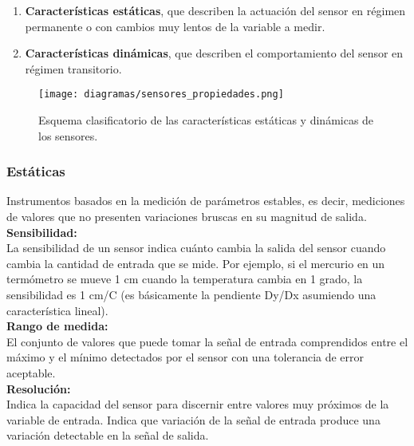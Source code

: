 \begin{enumerate}
 \item \textbf{Características estáticas}, que describen la actuación del sensor en régimen permanente o 
con cambios muy lentos de la variable a medir. \\
 \item \textbf{Características dinámicas}, que describen el comportamiento del sensor en régimen transitorio.\\
\end{enumerate}


\begin{figure}[H]
  \begin{center}
    \texttt{[image: diagramas/sensores\_propiedades.png]}
  \end{center}
  \label{fig:telemetria}
 \caption{Esquema clasificatorio de las características estáticas y dinámicas de los sensores.}
\end{figure}


\subsubsection{Estáticas}

Instrumentos basados en la medición de parámetros estables, es decir, mediciones de valores que no presenten variaciones bruscas en su magnitud de salida.\\

\textbf{Sensibilidad:}\\

La sensibilidad de un sensor indica cuánto cambia la salida del sensor cuando cambia la cantidad de entrada que se mide. Por ejemplo, si el mercurio en un termómetro se mueve
1 cm cuando la temperatura cambia en 1 grado, la sensibilidad es 1 cm/C (es básicamente la pendiente Dy/Dx asumiendo una característica lineal).\\

\textbf{Rango de medida:}\\

El  conjunto  de  valores  que  puede  tomar  la  señal  de  entrada comprendidos  entre  el  máximo  y  el  mínimo  detectados  por  el  sensor  con  una  tolerancia 
de error aceptable. \\

\textbf{Resolución:} \\

Indica la capacidad del sensor para discernir entre valores muy próximos de la variable de entrada. Indica que variación de la señal de entrada produce una variación detectable en la señal de salida. \\

